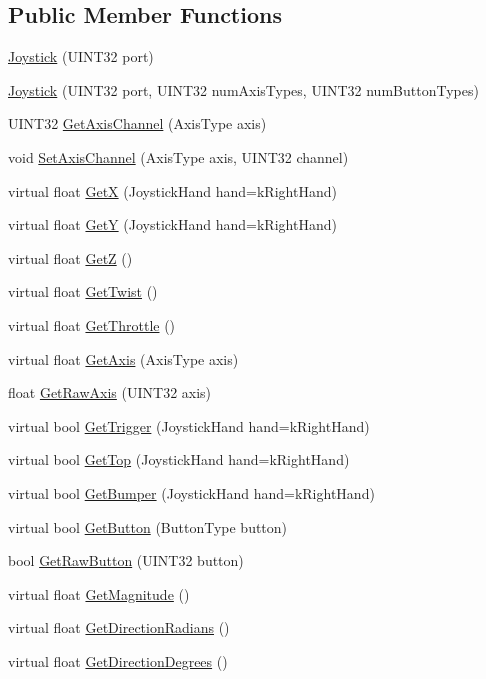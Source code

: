 \subsection*{Public Member Functions}
\begin{DoxyCompactItemize}
\item 
\hyperlink{classJoystick_aa4677050870682d557768df0b697e338}{Joystick} (UINT32 port)
\item 
\hyperlink{classJoystick_a2364b408bb646f19ca04ebb2a2249cb1}{Joystick} (UINT32 port, UINT32 numAxisTypes, UINT32 numButtonTypes)
\item 
UINT32 \hyperlink{classJoystick_a74e45168b9b71f6cd9b9bbe36f3bf29f}{GetAxisChannel} (AxisType axis)
\item 
void \hyperlink{classJoystick_a4909b232134c0748bc61e223e3552396}{SetAxisChannel} (AxisType axis, UINT32 channel)
\item 
virtual float \hyperlink{classJoystick_a684f7ef395e7cf4d1137e816554446c9}{GetX} (JoystickHand hand=kRightHand)
\item 
virtual float \hyperlink{classJoystick_a6f413b0da6c62d848113409acc9cb971}{GetY} (JoystickHand hand=kRightHand)
\item 
virtual float \hyperlink{classJoystick_a4e8c04b243729f58bf360a6584eac775}{GetZ} ()
\item 
virtual float \hyperlink{classJoystick_a3b29a1a8121657bd3ba4aa95db050a5f}{GetTwist} ()
\item 
virtual float \hyperlink{classJoystick_a3330cc651d36c58bffea669ff0b77161}{GetThrottle} ()
\item 
virtual float \hyperlink{classJoystick_a5f55e80b1399c3a04c5108488382dbc8}{GetAxis} (AxisType axis)
\item 
float \hyperlink{classJoystick_a392fb94197b2e25a4172b0fa91b49b04}{GetRawAxis} (UINT32 axis)
\item 
virtual bool \hyperlink{classJoystick_a17c9682c8bbfd77d9377d2352fb836dd}{GetTrigger} (JoystickHand hand=kRightHand)
\item 
virtual bool \hyperlink{classJoystick_a451c9a35875271e7918af8843e39f3cc}{GetTop} (JoystickHand hand=kRightHand)
\item 
virtual bool \hyperlink{classJoystick_a411e29a474092407733498198b3c79a2}{GetBumper} (JoystickHand hand=kRightHand)
\item 
virtual bool \hyperlink{classJoystick_ac8cf87154ee2b2241bc6d375dcebd728}{GetButton} (ButtonType button)
\item 
bool \hyperlink{classJoystick_ae5af1b7f54545088da91894fd105e1e2}{GetRawButton} (UINT32 button)
\item 
virtual float \hyperlink{classJoystick_a98ca6faf135eed78d1401f779ea862c2}{GetMagnitude} ()
\item 
virtual float \hyperlink{classJoystick_a1ffd1a1d97440eb1a611361bdcac33fc}{GetDirectionRadians} ()
\item 
virtual float \hyperlink{classJoystick_a0f49244825f4ce57aafde3830eba8e7f}{GetDirectionDegrees} ()
\end{DoxyCompactItemize}
